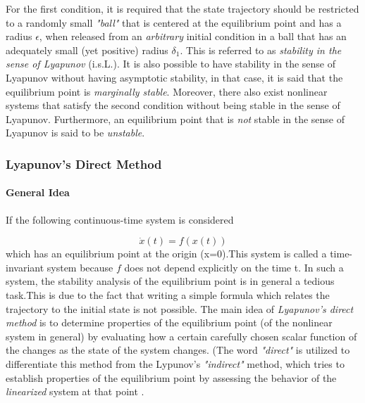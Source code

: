 \documentclass{thesisreport}
\begin{document}
For the first condition, it is required that the state trajectory should be restricted to a randomly small \textit{"ball"} that is centered at the equilibrium point and has a radius $\epsilon$, when released from an \textit{arbitrary} initial condition in a ball that has an adequately small (yet positive) radius $\delta_1$. This is referred to as \textit{stability in the sense of Lyapunov} (i.s.L.). It is also possible to have stability in the sense of Lyapunov without having asymptotic stability, in that case, it is said that the equilibrium point is \textit{marginally stable}. Moreover, there also exist nonlinear systems that satisfy the second condition without being stable in the sense of Lyapunov. Furthermore, an equilibrium point that is \textit{not} stable in the sense of Lyapunov is said to be \textit{unstable}.

\subsubsection{Lyapunov's Direct Method}

\paragraph{General Idea}

If the following continuous-time system is considered

\begin{equation} \label{Lyapunov_nonlinear_equation}
\dot{x}(t) = f(x(t))
\end{equation}
which has an equilibrium point at the origin (x=0).This system is called a time-invariant system because $f$ does not depend explicitly on the time t. In such a system, the stability analysis of the equilibrium point is in general a tedious task.This is due to the fact that writing a simple formula which relates the trajectory to the initial state is not possible. The main idea of \textit{Lyapunov's direct method} is to determine properties of the equilibrium point (of the nonlinear system in general) by evaluating how a certain carefully chosen scalar function of the changes as the state of the system changes. (The word \textit{"direct"} is utilized to differentiate this method from the Lypunov's \textit{"indirect"} method, which tries to establish properties of the equilibrium point by assessing the behavior of the \textit{linearized} system at that point \cite{MELCHORAGUILAR2004175}.
\end{document}
